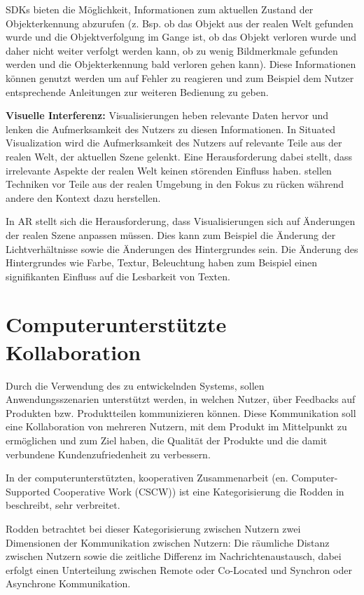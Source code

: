 SDKs bieten die Möglichkeit, Informationen zum aktuellen Zustand der Objekterkennung abzurufen (z. Bsp. ob das Objekt aus der realen Welt gefunden wurde und die Objektverfolgung im Gange ist, ob das Objekt verloren wurde und daher nicht weiter verfolgt werden kann, ob zu wenig Bildmerkmale gefunden werden und die Objekterkennung bald verloren gehen kann). 
Diese Informationen können genutzt werden um auf Fehler zu reagieren und zum Beispiel dem Nutzer entsprechende Anleitungen zur weiteren Bedienung zu geben.

\textbf{Visuelle Interferenz:}
\cite[S.~243]{DieterSchmalstieg2016} Visualisierungen heben relevante Daten hervor und lenken die Aufmerksamkeit des Nutzers zu diesen Informationen. In Situated Visualization 
wird die Aufmerksamkeit des Nutzers auf relevante Teile aus der realen Welt, der aktuellen Szene gelenkt. Eine Herausforderung dabei stellt, dass irrelevante Aspekte der realen Welt 
keinen störenden Einfluss haben. \cite{Kalkofen2007} stellen Techniken vor Teile aus der realen Umgebung in den Fokus zu rücken während andere den Kontext dazu herstellen. 

In AR stellt sich die Herausforderung, dass Visualisierungen sich auf Änderungen der realen Szene anpassen müssen. Dies kann zum Beispiel die Änderung der Lichtverhältnisse sowie die 
Änderungen des Hintergrundes sein. \cite{Gabbard} Die Änderung des Hintergrundes wie Farbe, Textur, Beleuchtung haben zum Beispiel einen signifikanten Einfluss auf die Lesbarkeit von Texten.   

\section{Computerunterstützte Kollaboration}

Durch die Verwendung des zu entwickelnden Systems, sollen Anwendungsszenarien unterstützt werden, in welchen Nutzer, 
über Feedbacks auf Produkten bzw. Produktteilen kommunizieren können. Diese Kommunikation soll eine Kollaboration von 
mehreren Nutzern, mit dem Produkt im Mittelpunkt zu ermöglichen und zum Ziel haben, die Qualität der Produkte und die 
damit verbundene Kundenzufriedenheit zu verbessern.     

In der computerunterstützten, kooperativen Zusammenarbeit (en. Computer-Supported Cooperative Work (CSCW)) 
ist eine Kategorisierung die Rodden in \cite[S.~2]{Rodden1992} beschreibt, sehr verbreitet.  


Rodden betrachtet bei dieser Kategorisierung zwischen Nutzern zwei Dimensionen der Kommunikation zwischen Nutzern: 
Die räumliche Distanz zwischen Nutzern sowie die zeitliche Differenz im Nachrichtenaustausch, dabei erfolgt einen Unterteilung zwischen 
Remote oder Co-Located und Synchron oder Asynchrone Kommunikation.


